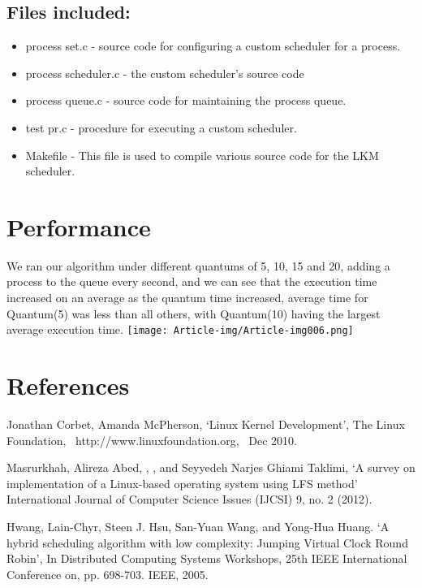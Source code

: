 \subsection{Files included:}
\begin{itemize}
\item process set.c - source code for configuring a custom scheduler for a process.
\item process scheduler.c - the custom scheduler's source code
\item process queue.c - source code for maintaining the process queue.
\item test pr.c - procedure for executing a custom scheduler.
\item Makefile - This file is used to compile various source code for the LKM scheduler.
\end{itemize}

\section*{Performance}

We ran our algorithm under different quantums of 5, 10, 15 and 20, adding a process to the queue every second, and we can see that the execution time increased on an average as the quantum time increased, average time for Quantum(5) was less than all others, with Quantum(10) having the largest average execution time.
 \texttt{[image: Article-img/Article-img006.png]} 
\section{References}

Jonathan Corbet, Amanda McPherson, `Linux Kernel Development', The Linux Foundation, \ http://www.linuxfoundation.org, \ Dec 2010. 

Masrurkhah, Alireza Abed, , , and Seyyedeh Narjes Ghiami Taklimi,
 `A survey on implementation of a Linux-based operating system using LFS method' International Journal of Computer Science Issues (IJCSI) 9, no. 2 (2012). 

Hwang, Lain-Chyr, Steen J. Hsu, San-Yuan Wang, and Yong-Hua Huang. `A hybrid scheduling algorithm with low complexity: Jumping Virtual Clock Round Robin',
 In Distributed Computing Systems Workshops, 25th IEEE International Conference on, pp. 698-703. IEEE, 2005. 

